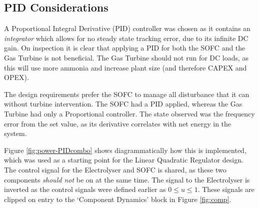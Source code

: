 \subsection{PID Considerations}
\label{sec:power-pid}

A Proportional Integral Derivative (PID) controller was chosen as it contains an \emph{integrator} which allows for no steady state tracking error, due to its infinite DC gain.
On inspection it is clear that applying a PID for both the SOFC and the Gas Turbine is not beneficial.
The Gas Turbine should not run for DC loads, as this will use more ammonia and increase plant size (and therefore CAPEX and OPEX).

The design requirements prefer the SOFC to manage all disturbance that it can without turbine intervention. The SOFC had a PID applied, whereas the Gas Turbine had only a Proportional controller.
The state observed was the frequency error from the set value, as its derivative correlates with net energy in the system.

Figure \ref{fig:power-PIDcombo} shows diagrammatically how this is implemented, which was used as a starting point for the Linear Quadratic Regulator design.
The control signal for the Electrolyser and SOFC is shared, as these two components \emph{should not} be on at the same time. The signal to the Electrolyser is inverted as the control signals were defined earlier as $0 \leq u \leq 1$.
These signals are clipped on entry to the `Component Dynamics' block in Figure \ref{fig:comp}.

